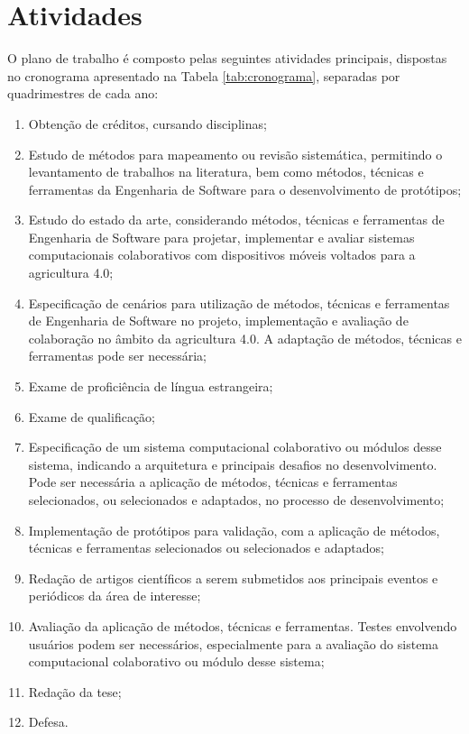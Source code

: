 \documentclass[12pt]{article}
\begin{document}
\section{Atividades}
\label{sec:atividades}

O plano de trabalho é composto pelas seguintes atividades principais, dispostas no cronograma apresentado na Tabela \ref{tab:cronograma}, separadas por quadrimestres de cada ano:

\begin{enumerate}
	\item Obtenção de créditos, cursando disciplinas;
	\item Estudo de métodos para mapeamento ou revisão sistemática, permitindo o levantamento de trabalhos na literatura, bem como métodos, técnicas e ferramentas da Engenharia de Software para o desenvolvimento de protótipos;
	\item Estudo do estado da arte, considerando métodos, técnicas e ferramentas de Engenharia de Software para projetar, implementar e avaliar sistemas computacionais colaborativos com dispositivos móveis voltados para a agricultura 4.0;
	\item Especificação de cenários para utilização de métodos, técnicas e ferramentas de Engenharia de Software no projeto, implementação e avaliação de colaboração no âmbito da agricultura 4.0. A adaptação de métodos, técnicas e ferramentas pode ser necessária;
	\item Exame de proficiência de língua estrangeira;
	\item Exame de qualificação;
	\item Especificação de um sistema computacional colaborativo ou módulos desse sistema, indicando a arquitetura e principais desafios no desenvolvimento. Pode ser necessária a aplicação de métodos, técnicas e ferramentas selecionados, ou selecionados e adaptados, no processo de desenvolvimento;
	\item Implementação de protótipos para validação, com a aplicação de métodos, técnicas e ferramentas selecionados ou selecionados e adaptados;
	\item Redação de artigos científicos a serem submetidos aos principais eventos e periódicos da área de interesse;
	\item Avaliação da aplicação de métodos, técnicas e ferramentas. Testes envolvendo usuários podem ser necessários, especialmente para a avaliação do sistema computacional colaborativo ou módulo desse sistema;
	\item Redação da tese;
	\item Defesa.
\end{enumerate}
\end{document}
